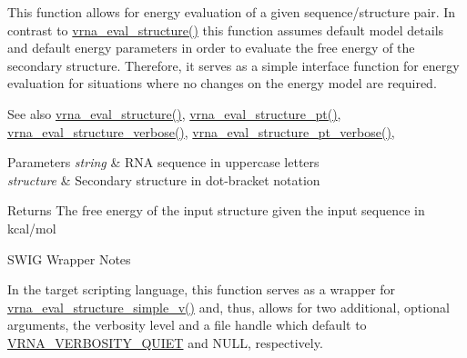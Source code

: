 This function allows for energy evaluation of a given sequence/structure pair. In contrast to \hyperlink{group__eval_ga58f199f1438d794a265f3b27fc8ea631}{vrna\+\_\+eval\+\_\+structure()} this function assumes default model details and default energy parameters in order to evaluate the free energy of the secondary structure. Therefore, it serves as a simple interface function for energy evaluation for situations where no changes on the energy model are required.

\begin{DoxySeeAlso}{See also}
\hyperlink{group__eval_ga58f199f1438d794a265f3b27fc8ea631}{vrna\+\_\+eval\+\_\+structure()}, \hyperlink{group__eval_gadbd09372ddfd7a450bbd590c96a6bfe4}{vrna\+\_\+eval\+\_\+structure\+\_\+pt()}, \hyperlink{group__eval_ga0928d699d310178f84ee2351034e5cb5}{vrna\+\_\+eval\+\_\+structure\+\_\+verbose()}, \hyperlink{group__eval_ga8a517cfeeae8c376ae7b1e0c401d38b4}{vrna\+\_\+eval\+\_\+structure\+\_\+pt\+\_\+verbose()},
\end{DoxySeeAlso}

\begin{DoxyParams}{Parameters}
{\em string} & R\+NA sequence in uppercase letters \\
\hline
{\em structure} & Secondary structure in dot-\/bracket notation \\
\hline
\end{DoxyParams}
\begin{DoxyReturn}{Returns}
The free energy of the input structure given the input sequence in kcal/mol
\end{DoxyReturn}
\begin{DoxyRefDesc}{S\+W\+I\+G Wrapper Notes}
\item[\hyperlink{wrappers__wrappers000041}{S\+W\+I\+G Wrapper Notes}]In the target scripting language, this function serves as a wrapper for \hyperlink{group__eval_gacd6278343e77d13f1d53588e50d303bc}{vrna\+\_\+eval\+\_\+structure\+\_\+simple\+\_\+v()} and, thus, allows for two additional, optional arguments, the verbosity level and a file handle which default to \hyperlink{group__eval_gaf4afe19780b61b4962c613bde324128b}{V\+R\+N\+A\+\_\+\+V\+E\+R\+B\+O\+S\+I\+T\+Y\+\_\+\+Q\+U\+I\+ET} and N\+U\+LL, respectively. \end{DoxyRefDesc}
\mbox{\label{group__eval_ga3e05a23ddf9b083f4e69881e440d4866}} 
